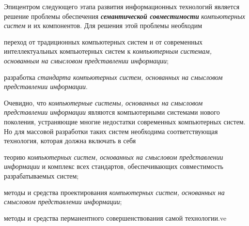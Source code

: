 \begin{SCn}
{	Эпицентром следующего этапа развития информационных технологий является решение проблемы обеспечения \textbf{\textit{семантической совместимости}} \textit{компьютерных систем} и их компонентов. Для решения этой проблемы необходим
	\begin{scnitemize}
		\item переход от традиционных компьютерных систем и от современных интеллектуальных компьютерных систем к \textit{компьютерным системам, основанным на смысловом представлении информации};
		\item разработка \textit{стандарта компьютерных систем, основанных на смысловом представлении информации}.
	\end{scnitemize}    
	
	Очевидно, что \textit{компьютерные системы, основанных на смысловом представлении информации} являются компьютерными системами нового поколения, устраняющие многие недостатки современных компьютерных систем. Но для массовой разработки таких систем необходима соответствующая технология, которая должна включать в себя  
	
	\begin{scnitemize}        
		\item теорию \textit{компьютерных систем, основанных на смысловом представлении информации} и комплекс всех стандартов, обеспечивающих совместимость разрабатываемых систем;
		\item методы и средства проектирования \textit{компьютерных систем, основанных на смысловом представлении информации};
		\item методы и средства перманентного совершенствования самой технологии.ve	\end{scnitemize}
}


\bigskip
\scnendstruct \scnendcurrentsectioncomment

\end{SCn}